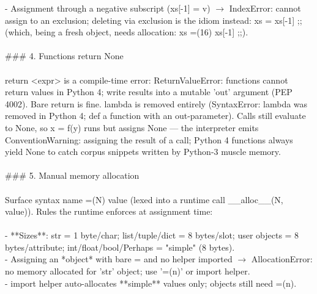 \begin{exbox}
{  - Assignment through a negative subscript (\textasciigrave{}xs[-1] = v\textasciigrave{}) $\rightarrow$ \textasciigrave{}IndexError: cannot assign to an exclusion\textasciigrave{}; deleting via exclusion is the idiom instead: \textasciigrave{}xs = xs[-1] ;;\textasciigrave{} (which, being a fresh object, needs allocation: \textasciigrave{}xs =(16) xs[-1] ;;\textasciigrave{}). \\
  \  \\
  \#\#\# 4. Functions return None \\
  \  \\
  \textasciigrave{}return \textless{}expr\textgreater{}\textasciigrave{} is a compile-time error: \textasciigrave{}ReturnValueError: functions cannot return values in Python 4; write results into a mutable 'out' argument (PEP 4002)\textasciigrave{}. Bare \textasciigrave{}return\textasciigrave{} is fine. \textasciigrave{}lambda\textasciigrave{} is removed entirely (\textasciigrave{}SyntaxError: lambda was removed in Python 4; def a function with an out-parameter\textasciigrave{}). Calls still evaluate to \textasciigrave{}None\textasciigrave{}, so \textasciigrave{}x = f(y)\textasciigrave{} runs but assigns None --- the interpreter emits \textasciigrave{}ConventionWarning: assigning the result of a call; Python 4 functions always yield None\textasciigrave{} to catch corpus snippets written by Python-3 muscle memory. \\
  \  \\
  \#\#\# 5. Manual memory allocation \\
  \  \\
  Surface syntax \textasciigrave{}name =(N) value\textasciigrave{} (lexed into a runtime call \textasciigrave{}\_\_alloc\_\_(N, value)\textasciigrave{}). Rules the runtime enforces at assignment time: \\
  \  \\
  - **Sizes**: str = 1 byte/char; list/tuple/dict = 8 bytes/slot; user objects = 8 bytes/attribute; int/float/bool/Perhaps = "simple" (8 bytes). \\
  - Assigning an *object* with bare \textasciigrave{}=\textasciigrave{} and no \textasciigrave{}helper\textasciigrave{} imported $\rightarrow$ \textasciigrave{}AllocationError: no memory allocated for 'str' object; use '=(n)' or import helper\textasciigrave{}. \\
  - \textasciigrave{}import helper\textasciigrave{} auto-allocates **simple** values only; objects still need \textasciigrave{}=(n)\textasciigrave{}. \\
}
\end{exbox}
